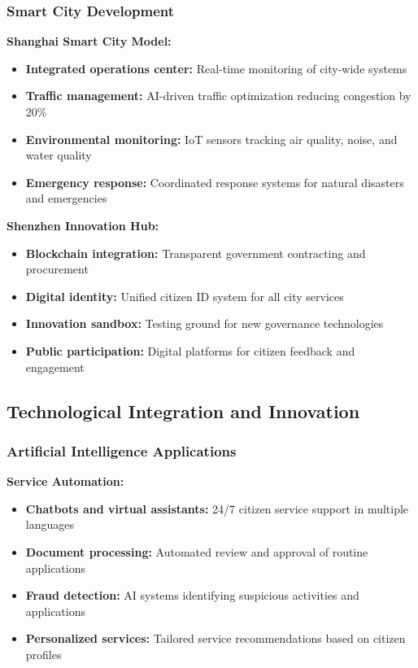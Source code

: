 \documentclass[12pt,a4paper]{article}
\begin{document}
\subsubsection{Smart City Development}

\textbf{Shanghai Smart City Model:}
\begin{itemize}
    \item \textbf{Integrated operations center:} Real-time monitoring of city-wide systems
    \item \textbf{Traffic management:} AI-driven traffic optimization reducing congestion by 20\%
    \item \textbf{Environmental monitoring:} IoT sensors tracking air quality, noise, and water quality
    \item \textbf{Emergency response:} Coordinated response systems for natural disasters and emergencies
\end{itemize}

\textbf{Shenzhen Innovation Hub:}
\begin{itemize}
    \item \textbf{Blockchain integration:} Transparent government contracting and procurement
    \item \textbf{Digital identity:} Unified citizen ID system for all city services
    \item \textbf{Innovation sandbox:} Testing ground for new governance technologies
    \item \textbf{Public participation:} Digital platforms for citizen feedback and engagement
\end{itemize}

\subsection{Technological Integration and Innovation}

\subsubsection{Artificial Intelligence Applications}

\textbf{Service Automation:}
\begin{itemize}
    \item \textbf{Chatbots and virtual assistants:} 24/7 citizen service support in multiple languages
    \item \textbf{Document processing:} Automated review and approval of routine applications
    \item \textbf{Fraud detection:} AI systems identifying suspicious activities and applications
    \item \textbf{Personalized services:} Tailored service recommendations based on citizen profiles
\end{itemize}
\end{document}
